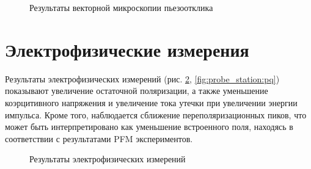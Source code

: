 \begin{figure}[ht]
    \caption{Результаты векторной микроскопии пьезоотклика}\label{fig:pfm:lateral:225mJ}
\end{figure}


\section{Электрофизические измерения}

Результаты электрофизических измерений (рис. \cref{fig:probe_station}, \cref{fig:probe_station:pq}) показывают увеличение остаточной поляризации, а также уменьшение коэрцитивного напряжения и увеличение тока утечки при увеличении энергии импульса. Кроме того, наблюдается сближение переполяризационных пиков, что может быть интерпретировано как уменьшение встроенного поля, находясь в соответствии с результатами PFM экспериментов.

\begin{figure}[ht]
    \caption[Этот текст попадает в названия рисунков в списке рисунков]{Результаты электрофизических измерений}\label{fig:probe_station}
\end{figure}

